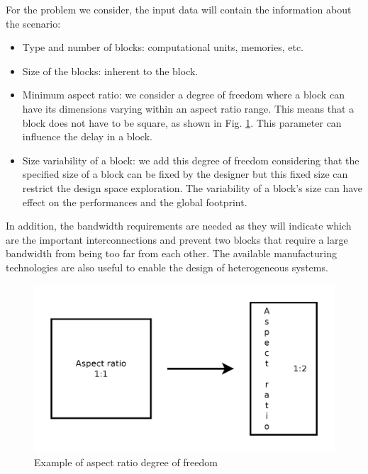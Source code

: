 For the problem we consider, the input data will contain the information about the scenario:
\begin{itemize}
\item Type and number of blocks: computational units, memories, etc.
\item Size of the blocks: inherent to the block.
\item Minimum aspect ratio: we consider a degree of freedom where a block can have its dimensions varying within an aspect ratio range. This means that a block does not have to be square, as shown in Fig. \ref{fig:ff_ex}. This parameter can influence the delay in a block.
\item Size variability of a block: we add this degree of freedom considering that the specified size of a block can be fixed by the designer but this fixed size can restrict the design space exploration. The variability of a block's size can have effect on the performances and the global footprint.
\end{itemize}
In addition, the bandwidth requirements are needed as they will indicate which are the important interconnections and prevent two blocks that require a large bandwidth from being too far from each other. The available manufacturing technologies are also useful to enable the design of heterogeneous systems.

\begin{figure}[h!]
\begin{center}
\includegraphics[width=\linewidth]{form_factor_ex.pdf}
\end{center}
\vspace{-0.5cm}
\caption{Example of aspect ratio degree of freedom}
\label{fig:ff_ex}
\end{figure}

